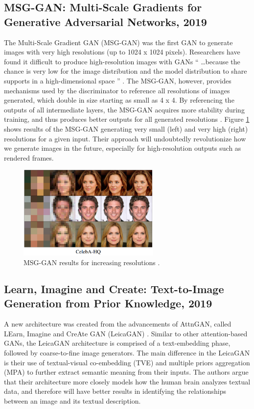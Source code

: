 \documentclass[letterpaper]{article} %
\begin{document}
\subsection{MSG-GAN: Multi-Scale Gradients for Generative Adversarial
Networks, 2019}
The Multi-Scale Gradient GAN (MSG-GAN) was the first GAN to generate images 
with very high resolutions (up to 1024 x 1024 pixels).
Researchers have found it difficult to produce high-resolution images with GANs
``
\dots because the chance is
very low for the image distribution and the model distribution
to share supports in a high-dimensional space
'' \cite{stackgan++}.
The MSG-GAN, however, provides mechanisms used by the discriminator to 
reference all resolutions of images generated, which double in size starting as 
small as 4 x 4. By referencing the outputs of all intermediate layers, the 
MSG-GAN acquires more stability during training, and thus produces better 
outputs for all generated resolutions
\cite{msggan}. Figure \ref{fig:msggan} shows results of the MSG-GAN generating 
very small (left) and very high (right) resolutions for a given input.
Their approach will undoubtedly revolutionize how we generate images in the 
future, especially for high-resolution outputs such as rendered frames.

\begin{figure}[htbp]
	\centerline{\includegraphics[width=7cm]{msggan.png}}
	\caption{MSG-GAN results for increasing resolutions
		\cite{msggan}.}
	\label{fig:msggan}
\end{figure}

\subsection{Learn, Imagine and Create: Text-to-Image Generation from Prior 
Knowledge, 2019}
A new architecture was created from the advancements of AttnGAN, called LEarn, 
Imagine and CreAte GAN (LeicaGAN) \cite{leica}. Similar to other 
attention-based GANs, the LeicaGAN architecture is comprised of a 
text-embedding phase, followed by coarse-to-fine image generators. The main 
difference in the LeicaGAN is their use of textual-visual co-embedding (TVE) 
and multiple priors aggregation (MPA) to further extract semantic meaning from 
their inputs. The authors argue that their architecture more closely models how 
the human brain analyzes textual data, and therefore will have better results 
in identifying the relationships between an image and its textual description.
\end{document}
